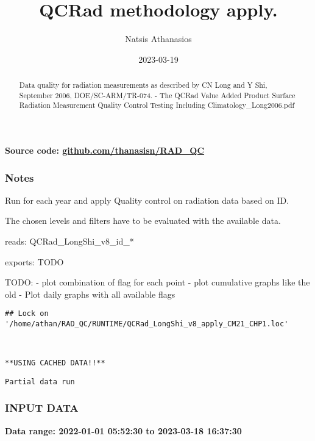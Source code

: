 \documentclass[
  10pt,
  a4paper,oneside]{article}
\title{QCRad methodology apply.}
\author{Natsis Athanasios}
\date{2023-03-19}
\begin{document}
\maketitle
\begin{abstract}
Data quality for radiation measurements as described by CN Long and Y Shi, September 2006, DOE/SC-ARM/TR-074. - The QCRad Value Added Product Surface Radiation Measurement Quality Control Testing Including Climatology\_Long2006.pdf
\end{abstract}

{
\hypersetup{linkcolor=}
\setcounter{tocdepth}{2}
\tableofcontents
}
\textbf{Source code: \href{https://github.com/thanasisn/RAD_QC}{github.com/thanasisn/RAD\_QC}}

\hypertarget{notes}{%
\subsubsection{Notes}\label{notes}}

Run for each year and apply Quality control on radiation data based on ID.

The chosen levels and filters have to be evaluated with the available data.

reads: QCRad\_LongShi\_v8\_id\_*

exports: TODO

TODO:
- plot combination of flag for each point
- plot cumulative graphs like the old
- Plot daily graphs with all available flags

\begin{verbatim}
## Lock on '/home/athan/RAD_QC/RUNTIME/QCRad_LongShi_v8_apply_CM21_CHP1.loc'
\end{verbatim}

\begin{verbatim}


**USING CACHED DATA!!**
\end{verbatim}

\begin{verbatim}
Partial data run
\end{verbatim}

\hypertarget{input-data}{%
\subsubsection{INPUT DATA}\label{input-data}}

\textbf{Data range: 2022-01-01 05:52:30 to 2023-03-18 16:37:30}
\end{document}
